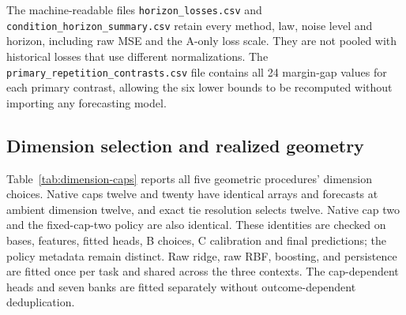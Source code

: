 The machine-readable files \texttt{horizon\_losses.csv} and
\texttt{condition\_horizon\_summary.csv} retain every method, law, noise
level and horizon, including raw MSE and the A-only loss scale. They are not
pooled with historical losses that use different normalizations. The
\texttt{primary\_repetition\_contrasts.csv} file contains all 24 margin-gap values for
each primary contrast, allowing the six lower bounds to be recomputed without
importing any forecasting model.

\begin{table}[!htbp]
\centering\small
\caption{Nonlinear horizon-specific SMSE, averaged equally over the six
law--noise conditions and 24 repetitions. Except for the first two fixed
KAHM rows, procedures use their independently selected caps where applicable.
Every non-ridge forecast includes its C calibration. These descriptive
summaries retain the original A-only variance scales.}
\label{tab:dimension-horizons}

\end{table}

\subsection{Dimension selection and realized geometry}

Table~\ref{tab:dimension-caps} reports all five geometric procedures'
dimension choices. Native caps twelve and twenty have identical arrays
and forecasts at ambient dimension twelve, and exact tie resolution selects
twelve. Native cap two and the fixed-cap-two policy are also identical.
These identities are checked on bases, features, fitted heads, B choices,
C calibration and final predictions; the policy metadata remain distinct.
Raw ridge, raw RBF, boosting, and persistence are fitted once per task and
shared across the three contexts. The cap-dependent heads and seven banks
are fitted separately without outcome-dependent deduplication.

\begin{table}[!htbp]
\centering\small
\caption{B-selected cap counts. Each procedure contributes 144 nonlinear
and 48 linear tasks; it selects one cap across all three horizons before
C calibration. Exact cap-twelve/cap-twenty ties explain the zero final
column. The common and RBF rows use their own choices, not KAHM's choices.}
\label{tab:dimension-caps}

\end{table}

